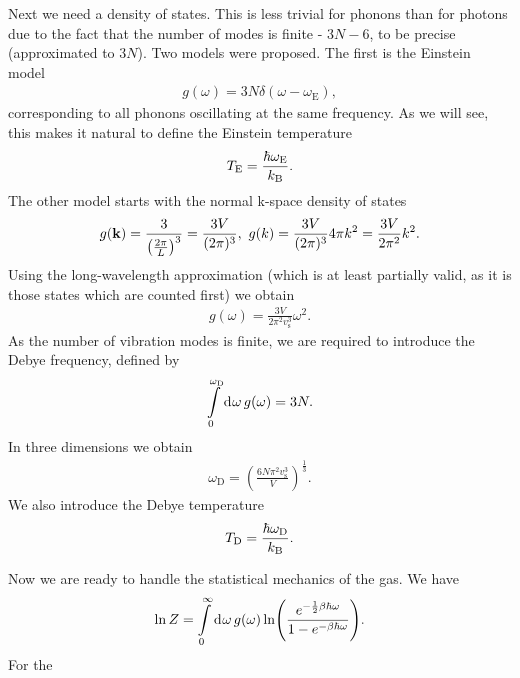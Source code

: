 Next we need a density of states. This is less trivial for phonons than for photons due to the fact that the number of modes is finite - $3N - 6$, to be precise (approximated to $3N$). Two models were proposed. The first is the Einstein model
\begin{align*}
	g(\omega) = 3N\delta(\omega - \omega_{\text{E}}),
\end{align*}
corresponding to all phonons oscillating at the same frequency. As we will see, this makes it natural to define the Einstein temperature
\begin{align*}
	T_{\text{E}} = \frac{\hbar\omega_{\text{E}}}{k_{\text{B}}}.
\end{align*}
The other model starts with the normal k-space density of states
\begin{align*}
	g(\vb{k}) = \frac{3}{\left(\frac{2\pi}{L}\right)^{3}} = \frac{3V}{(2\pi)^{3}},\ g(k) = \frac{3V}{(2\pi)^{3}}4\pi k^{2} = \frac{3V}{2\pi^{2}}k^{2}.
\end{align*}
Using the long-wavelength approximation (which is at least partially valid, as it is those states which are counted first) we obtain
\begin{align*}
	g(\omega) = \frac{3V}{2\pi^{2}v_{\text{s}}^{3}}\omega^{2}.
\end{align*}
As the number of vibration modes is finite, we are required to introduce the Debye frequency, defined by
\begin{align*}
	\int\limits_{0}^{\omega_{\text{D}}}\dd[]{\omega}g(\omega) = 3N.
\end{align*}
In three dimensions we obtain
\begin{align*}
	\omega_{\text{D}} = \left(\frac{6N\pi^{2}v_{\text{s}}^{3}}{V}\right)^{\frac{1}{3}}.
\end{align*}
We also introduce the Debye temperature
\begin{align*}
	T_{\text{D}} = \frac{\hbar\omega_{\text{D}}}{k_{\text{B}}}.
\end{align*}

Now we are ready to handle the statistical mechanics of the gas. We have
\begin{align*}
	\ln{Z} = \int\limits_{0}^{\infty}\dd[]{\omega}g(\omega)\ln(\frac{e^{-\frac{1}{2}\beta\hbar\omega}}{1 - e^{-\beta\hbar\omega}}).
\end{align*}
For the 